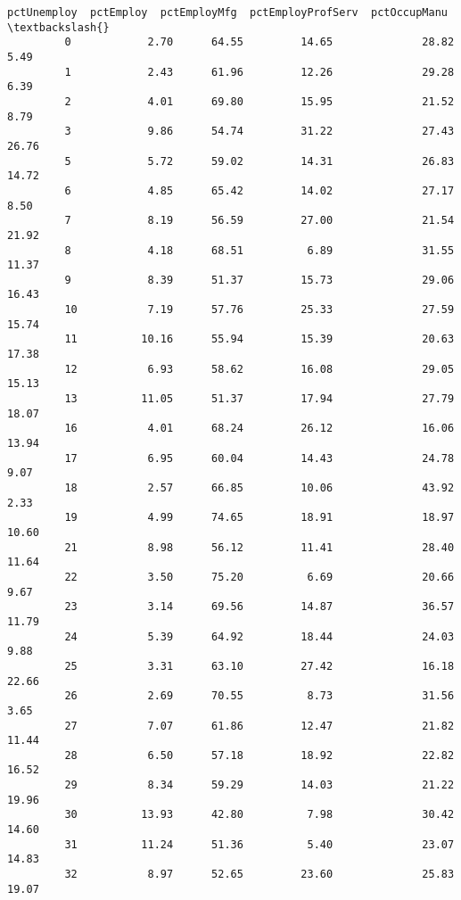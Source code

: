 \documentclass[11pt]{llncs}
\begin{document}
\begin{Verbatim}[commandchars=\\\{\}]
               pctUnemploy  pctEmploy  pctEmployMfg  pctEmployProfServ  pctOccupManu  \textbackslash{}
         0            2.70      64.55         14.65              28.82          5.49   
         1            2.43      61.96         12.26              29.28          6.39   
         2            4.01      69.80         15.95              21.52          8.79   
         3            9.86      54.74         31.22              27.43         26.76   
         5            5.72      59.02         14.31              26.83         14.72   
         6            4.85      65.42         14.02              27.17          8.50   
         7            8.19      56.59         27.00              21.54         21.92   
         8            4.18      68.51          6.89              31.55         11.37   
         9            8.39      51.37         15.73              29.06         16.43   
         10           7.19      57.76         25.33              27.59         15.74   
         11          10.16      55.94         15.39              20.63         17.38   
         12           6.93      58.62         16.08              29.05         15.13   
         13          11.05      51.37         17.94              27.79         18.07   
         16           4.01      68.24         26.12              16.06         13.94   
         17           6.95      60.04         14.43              24.78          9.07   
         18           2.57      66.85         10.06              43.92          2.33   
         19           4.99      74.65         18.91              18.97         10.60   
         21           8.98      56.12         11.41              28.40         11.64   
         22           3.50      75.20          6.69              20.66          9.67   
         23           3.14      69.56         14.87              36.57         11.79   
         24           5.39      64.92         18.44              24.03          9.88   
         25           3.31      63.10         27.42              16.18         22.66   
         26           2.69      70.55          8.73              31.56          3.65   
         27           7.07      61.86         12.47              21.82         11.44   
         28           6.50      57.18         18.92              22.82         16.52   
         29           8.34      59.29         14.03              21.22         19.96   
         30          13.93      42.80          7.98              30.42         14.60   
         31          11.24      51.36          5.40              23.07         14.83   
         32           8.97      52.65         23.60              25.83         19.07   

\end{Verbatim}
\end{document}
